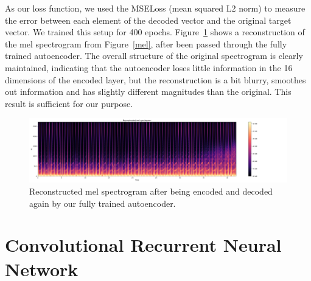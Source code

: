     As our loss function, we used the MSELoss (mean squared L2 norm) to measure the error between each element of the decoded vector and the original target vector. 
    We trained this setup for 400 epochs.
    Figure~\ref{reconstructed} shows a reconstruction of the mel spectrogram from Figure~\ref{mel}, after been passed through the fully trained autoencoder.
    The overall structure of the original spectrogram is clearly maintained, indicating that the autoencoder loses little information in the 16 dimensions of the encoded layer, but the reconstruction is a bit blurry, smoothes out information and has slightly different magnitudes than the original. This result is sufficient for our purpose.

    \begin{figure}
        \centering
        \includegraphics[width=\textwidth, trim=10 0 220 0, clip]{images/recon_spec}
        \caption{Reconstructed mel spectrogram after being encoded and decoded again by our fully trained autoencoder.}
        \label{reconstructed}
    \end{figure}
    
\section{Convolutional Recurrent Neural Network}

